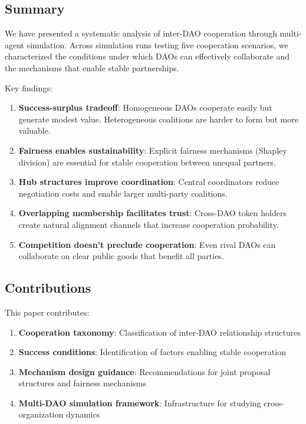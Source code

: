 
\subsection{Summary}

We have presented a systematic analysis of inter-DAO cooperation through multi-agent simulation. Across \experimentruns{} simulation runs testing five cooperation scenarios, we characterized the conditions under which DAOs can effectively collaborate and the mechanisms that enable stable partnerships.

Key findings:

\begin{enumerate}
    \item \textbf{Success-surplus tradeoff}: Homogeneous DAOs cooperate easily but generate modest value. Heterogeneous coalitions are harder to form but more valuable.

    \item \textbf{Fairness enables sustainability}: Explicit fairness mechanisms (Shapley division) are essential for stable cooperation between unequal partners.

    \item \textbf{Hub structures improve coordination}: Central coordinators reduce negotiation costs and enable larger multi-party coalitions.

    \item \textbf{Overlapping membership facilitates trust}: Cross-DAO token holders create natural alignment channels that increase cooperation probability.

    \item \textbf{Competition doesn't preclude cooperation}: Even rival DAOs can collaborate on clear public goods that benefit all parties.
\end{enumerate}

\subsection{Contributions}

This paper contributes:

\begin{enumerate}
    \item \textbf{Cooperation taxonomy}: Classification of inter-DAO relationship structures
    \item \textbf{Success conditions}: Identification of factors enabling stable cooperation
    \item \textbf{Mechanism design guidance}: Recommendations for joint proposal structures and fairness mechanisms
    \item \textbf{Multi-DAO simulation framework}: Infrastructure for studying cross-organization dynamics
\end{enumerate}

